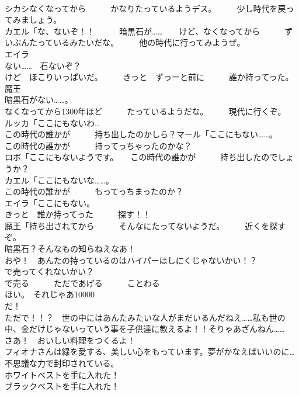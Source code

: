 \documentclass[8pt]{extreport}
\begin{document}
\begin{CJK}{UTF8}{min}
\\	シカシなくなってから　　　かなりたっているようデス。　　　少し時代を戻ってみましょう。	
\\	カエル「な、ないぞ！！　　　暗黒石が……　　けど、なくなってから　　　ずいぶんたっているみたいだな。　　　他の時代に行ってみようぜ。	
\\	エイラ
\\	ない……　石ないぞ？	
\\	けど　ほこりいっぱいだ。　　　きっと　ずっーと前に　　　誰か持ってった。	
\\	魔王
\\	暗黒石がない……。　　
\\	なくなってから1300年ほど　　　たっているようだな。　　　現代に行くぞ。	
\\	ルッカ「ここにもないわ…	
\\	この時代の誰かが　　　持ち出したのかしら？マール「ここにもない……。	
\\	この時代の誰かが　　　持ってっちゃったのかな？	
\\	ロボ「ここにもないようです。　　この時代の誰かが　　　持ち出したのでしょうか？	
\\	カエル「ここにもないな……。	
\\	この時代の誰かが　　　もってっちまったのか？	
\\	エイラ「ここにもない。	
\\	きっと　誰か持ってった　　　探す！！	
\\	魔王「持ち出されてから　　　そんなにたってないようだ。　　　近くを探すぞ。	
\\	暗黒石？そんなもの知らねえなあ！	
\\	おや！　あんたの持っているのはハイパーほしにくじゃないかい！？	
\\	で売ってくれないかい？　　　
\\	で売る　　　ただであげる　　　ことわる	
\\	ほい。　それじゃあ10000
\\	だ！	
\\	ただで！！？　世の中にはあんたみたいな人がまだいるんだねえ……私も世の中、金だけじゃないっていう事を子供達に教えるよ！！そりゃあざんねん……	
\\	さあ！　おいしい料理をつくるよ！	
\\	フィオナさんは緑を愛する、美しい心をもっています。夢がかなえばいいのに…	
\\	不思議な力で封印されている。	
\\	ホワイトベストを手に入れた！	
\\	ブラックベストを手に入れた！	

\end{CJK}
\end{document}
